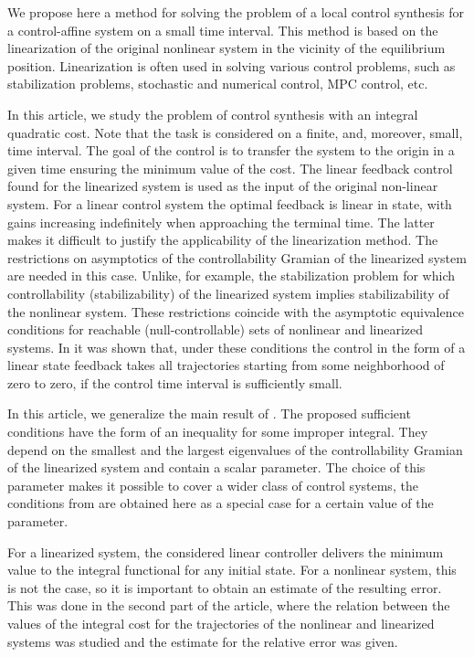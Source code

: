 \documentclass[../main.tex]{subfiles}
\begin{document}
We propose here a method for solving the problem of a local control synthesis  for a control-affine system on a small time interval. This method is based  on the linearization of the original nonlinear system in the vicinity  of the equilibrium position.  Linearization is often used in solving various control problems, such as stabilization problems\cite{Kras_add,Khalil}, stochastic and numerical control\cite{Roxin,EKF,denBerg,Pang}, MPC control\cite{Murillo,LTV_MPC}, etc.

In this article, we study the problem of control synthesis with an integral quadratic cost. Note that the task is considered on a finite, and, moreover, small, time interval. The goal of the control is to transfer the system to the origin in a given time ensuring the minimum value of the cost. The linear feedback control found for the linearized system is used as  the input of the original non-linear system. For a linear control system the optimal feedback is linear in state, with gains increasing indefinitely when approaching the terminal time. The latter  makes it difficult to justify the applicability of the linearization method. The restrictions on  asymptotics  of the controllability Gramian of the linearized system are needed in this case. Unlike, for example, the stabilization problem for which controllability (stabilizability) of the linearized system implies stabilizability of the nonlinear system. These restrictions coincide with the  asymptotic equivalence conditions for reachable  (null-controllable) sets of nonlinear and linearized systems. In \cite{GusevOsipov} it was shown that, under these conditions the control in the form of a linear state feedback takes all trajectories starting from some neighborhood of zero to zero, if the control time interval is sufficiently small. 

In this article, we generalize the main result of \cite{GusevOsipov}. The proposed sufficient conditions have the form of an inequality for some improper integral. They depend on the smallest and the largest eigenvalues of the controllability Gramian of the linearized system and contain a scalar parameter. The choice of this parameter makes it possible to cover a wider class of control systems, the conditions from \cite{GusevOsipov} are obtained here as a special case for a certain value of the parameter.

For a linearized system, the considered linear controller delivers the minimum value to the integral functional for any initial state. For a nonlinear system, this is not the case, so it is important to obtain an estimate of the resulting error. This was done in the second part of the article, where  the relation between the values of the integral cost for the trajectories of the nonlinear and linearized systems was studied and  the estimate for the relative error was given. 
\end{document}
